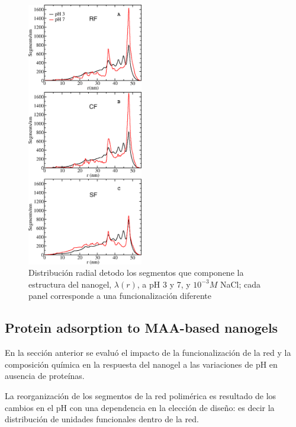 \begin{figure}[!htb]
	\centering
	\includegraphics[width=0.45\textwidth]{Figures/graphs-gel2/allseg_SI.png}
	\caption{Distribuci\'on radial detodo los segmentos que componene la estructura del nanogel, $\lambda(r)$, a pH 3 y 7, y $10^{-3}M$ NaCl; cada panel corresponde a una funcionalizaci\'on  diferente}
	\label{fig:esf:allr-distribution}
\end{figure}




\subsection{Protein adsorption to MAA-based nanogels}\label{sec:MAA-NGs}




En la secci\'on anterior se  evalu\'o el impacto de la funcionalizaci\'on de la red y la composici\'on qu\'imica en la respuesta del nanogel a las variaciones de pH en ausencia de prote\'inas.

La reorganizaci\'on de los segmentos de la red polim\'erica es resultado de los cambios en el pH con una dependencia en la elecci\'on de dise\~no: es decir la distribuci\'on de unidades funcionales dentro de la red.

